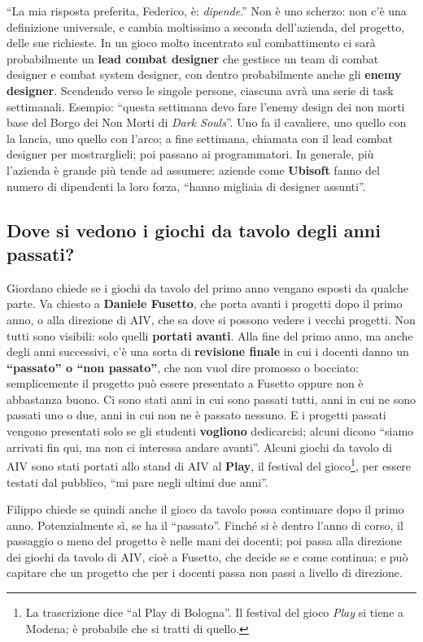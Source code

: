 ``La mia risposta preferita, Federico, è: \emph{dipende}.'' Non è uno
scherzo: non c'è una definizione universale, e cambia moltissimo a seconda
dell'azienda, del progetto, delle sue richieste. In un gioco molto incentrato
sul combattimento ci sarà probabilmente un \textbf{lead combat designer} che
gestisce un team di combat designer e combat system designer, con dentro
probabilmente anche gli \textbf{enemy designer}. Scendendo verso le singole
persone, ciascuna avrà una serie di task settimanali. Esempio: ``questa
settimana devo fare l'enemy design dei non morti base del Borgo dei Non Morti
di \emph{Dark Souls}''. Uno fa il cavaliere, uno quello con la lancia, uno
quello con l'arco; a fine settimana, chiamata con il lead combat designer per
mostrarglieli; poi passano ai programmatori. In generale, più l'azienda è
grande più tende ad assumere: aziende come \textbf{Ubisoft} fanno del numero
di dipendenti la loro forza, ``hanno migliaia di designer assunti''.

\subsection{Dove si vedono i giochi da tavolo degli anni passati?}

Giordano chiede se i giochi da tavolo del primo anno vengano esposti da
qualche parte. Va chiesto a \textbf{Daniele Fusetto}, che porta avanti i
progetti dopo il primo anno, o alla direzione di AIV, che sa dove si possono
vedere i vecchi progetti. Non tutti sono visibili: solo quelli \textbf{portati
avanti}. Alla fine del primo anno, ma anche degli anni successivi, c'è una
sorta di \textbf{revisione finale} in cui i docenti danno un
\textbf{``passato'' o ``non passato''}, che non vuol dire promosso o
bocciato: semplicemente il progetto può essere presentato a Fusetto oppure
non è abbastanza buono. Ci sono stati anni in cui sono passati tutti, anni in
cui ne sono passati uno o due, anni in cui non ne è passato nessuno. E i
progetti passati vengono presentati solo se gli studenti \textbf{vogliono}
dedicarcisi; alcuni dicono ``siamo arrivati fin qui, ma non ci interessa
andare avanti''. Alcuni giochi da tavolo di AIV sono stati portati allo stand
di AIV al \textbf{Play}, il festival del gioco\footnote{La trascrizione dice
``al Play di Bologna''. Il festival del gioco \emph{Play} si tiene a Modena;
è probabile che si tratti di quello.}, per essere testati dal pubblico,
``mi pare negli ultimi due anni''.

Filippo chiede se quindi anche il gioco da tavolo possa continuare dopo il
primo anno. Potenzialmente sì, se ha il ``passato''. Finché si è dentro
l'anno di corso, il passaggio o meno del progetto è nelle mani dei docenti;
poi passa alla direzione dei giochi da tavolo di AIV, cioè a Fusetto, che
decide se e come continua; e può capitare che un progetto che per i docenti
passa non passi a livello di direzione.

